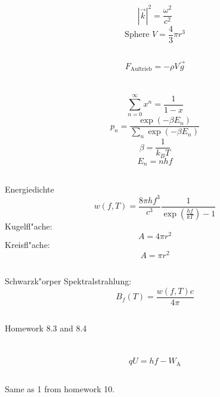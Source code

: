 \documentclass[12pt]{report}
\begin{document}
\subsection{}
\[|\vec{k}|^2=\frac{\omega^2}{c^2}\]
\[\textrm{Sphere }V=\frac{4}{3}\pi r^3\]

\subsection{} 
\[F_\mathrm{Auftrieb}=-\rho V\vec{g}\]

\section{}

\subsection{}
\[\sum_{n=0}^\infty x^n=\frac{1}{1-x}\]
\[p_n=\frac{\exp(-\beta E_n)}{\sum_n\exp(-\beta E_n)}\]
\[\beta=\frac{1}{k_BT}\]
\[E_n=nhf\]

\subsection{}

Energiedichte
\[w(f,T)=\frac{8\pi hf^3}{c^3}\frac{1}{\exp\left(\frac{hf}{kT}\right)-1}\]
Kugelfl"ache:
\[A=4\pi r^2\]
Kreisfl"ache:
\[A=\pi r^2\]

\subsection{}
Schwarzk"orper Spektralstrahlung:
\[B_f(T)=\frac{w(f,T)c}{4\pi}\]

\subsection{}
Homework 8.3 and 8.4

\section{}

\subsection{}
\[qU=hf-W_\mathrm{A}\]

\subsection{}
Same as 1 from homework 10.
\end{document}
